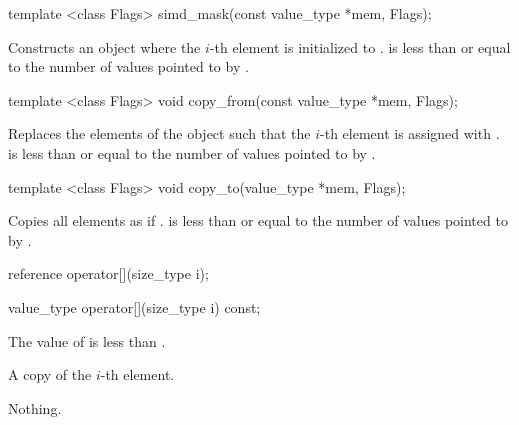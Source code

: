 \begin{itemdecl}
template <class Flags> simd_mask(const value_type *mem, Flags);
\end{itemdecl}
\begin{itemdescr}
  \pnum\effects Constructs an object where the $i$-th element is initialized to  \foralli.
  \pnum\requires {} is less than or equal to the number of values pointed to by .
  \flagsRemarks{\mask{}}
\end{itemdescr}

\begin{itemdecl}
template <class Flags> void copy_from(const value_type *mem, Flags);
\end{itemdecl}
\begin{itemdescr}
  \pnum\effects Replaces the elements of the \mask object such that the $i$-th element is assigned with  \foralli.
  \pnum\requires {} is less than or equal to the number of values pointed to by .
  \flagsRemarks{\mask{}}
\end{itemdescr}

\begin{itemdecl}
template <class Flags> void copy_to(value_type *mem, Flags);
\end{itemdecl}
\begin{itemdescr}
  \pnum\effects Copies all \mask elements as if  \foralli.
  \pnum\requires {} is less than or equal to the number of values pointed to by .
  \flagsRemarks{\mask{}}
\end{itemdescr}

\begin{itemdecl}
reference operator[](size_type i);
\end{itemdecl}
\begin{itemdescr}
  \simdElementReference{\mask{}}
\end{itemdescr}

\begin{itemdecl}
value_type operator[](size_type i) const;
\end{itemdecl}
\begin{itemdescr}
  \pnum\requires The value of  is less than .

  \pnum\returns A copy of the $i$-th element.

  \pnum\throws Nothing.
\end{itemdescr}


